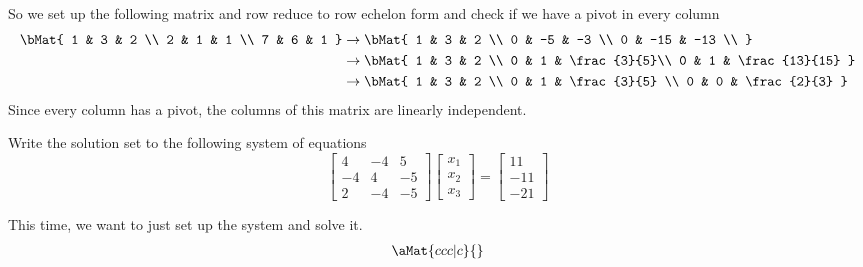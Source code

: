 \documentclass[12pt,addpoints,answers]{exam}
\begin{document}
\begin{questions}
\begin{solution}
            So we set up the following matrix and row reduce to row echelon form and check if
            we have a pivot in every column
            \begin{eqnarray*}
                \bMat{
                    1 & 3 & 2 \\
                    2 & 1 & 1 \\
                    7 & 6 & 1
                }&\rightarrow\bMat{
                    1 & 3 & 2 \\
                    0 & -5 & -3 \\
                    0 & -15 & -13 \\
                }\\
                &\rightarrow\bMat{
                    1 & 3 & 2 \\
                    0 & 1 & \frac{3}{5}\\
                    0 & 1 & \frac{13}{15}
                }\\
                &\rightarrow\bMat{
                    1 & 3 & 2 \\
                    0 & 1 & \frac{3}{5} \\
                    0 & 0 & \frac{2}{3}
                }
            \end{eqnarray*}
            Since every column has a pivot, the columns of this matrix are linearly independent.
        \end{solution}
        \vfill
        \newpage
        \question[15] Write the solution set to the following system of equations
        \[
            \begin{bmatrix}
                4 &-4 & 5 \\
                -4& 4 &-5 \\
                2 &-4 &-5
            \end{bmatrix}
            \begin{bmatrix} x_1 \\ x_2 \\ x_3 \end{bmatrix} =
            \begin{bmatrix} 11\\-11\\-21 \end{bmatrix}
        \]
        \begin{solution}
            This time, we want to just set up the system and solve it.
            \begin{eqnarray*}
                \aMat{ccc|c}{
}
\end{eqnarray*}
\end{solution}
\end{questions}
\end{document}
